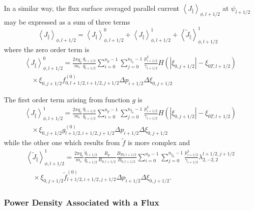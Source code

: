 In a similar way, the flux surface averaged parallel current $\left\langle
J_{\Vert}\right\rangle _{\phi,l+1/2}$ at $\psi_{l+1/2}$ may be expressed as a
sum of three terms
\begin{equation}
\left\langle J_{\Vert}\right\rangle _{\phi,l+1/2}=\left\langle J_{\Vert
}\right\rangle _{\phi,l+1/2}^{0}+\left\langle J_{\Vert}\right\rangle
_{\phi,l+1/2}^{1}+\left\langle \widetilde{J}_{\Vert}\right\rangle
_{\phi,l+1/2}^{1}%
\end{equation}
where the zero order term is
\begin{align}
&\left\langle J_{\Vert}\right\rangle _{\phi,l+1/2}^{0}=\frac{2\pi q_{e}}{m_{e}%
}\frac{q_{l+1/2}}{\overline{q}_{l+1/2}}\sum_{i=0}^{n_{p}-1}\sum_{j=0}%
^{n_{\xi_{0}}-1}\frac{p_{i+1/2}^{3}}{\gamma_{i+1/2}}H\left(  \left|
\xi_{0,j+1/2}\right|  -\xi_{0T,l+1/2}\right)\nonumber\\&\quad\times  \xi_{0,j+1/2}%
f_{0,l+1/2,i+1/2,j+1/2}^{(0)}\Delta p_{i+1/2}\Delta\xi_{0,j+1/2}%
\end{align}

The first order term arising from function $g$ is
\begin{align}
&\left\langle J_{\Vert}\right\rangle _{\phi,l+1/2}^{1}=\frac{2\pi q_{e}}{m_{e}%
}\frac{q_{l+1/2}}{\overline{q}_{l+1/2}}\sum_{i=0}^{n_{p}-1}\sum_{j=0}%
^{n_{\xi_{0}}-1}\frac{p_{i+1/2}^{3}}{\gamma_{i+1/2}}H\left(  \left|
\xi_{0,j+1/2}\right|  -\xi_{0T,l+1/2}\right) \nonumber\\&\quad\times \xi_{0,j+1/2}%
g_{l+1/2,i+1/2,j+1/2}^{(0)}\Delta p_{i+1/2}\Delta\xi_{0,j+1/2}%
\end{align}
while the other one which results from $\widetilde{f}$ is more
complex and
\begin{align}
&\left\langle \widetilde{J}_{\Vert}\right\rangle
_{\phi,l+1/2}^{1}=\frac{2\pi
q_{e}}{m_{e}}\frac{\widetilde{q}_{l+1/2}}{\overline{q}_{l+1/2}}\frac{R_{p}%
}{R_{0,l+1/2}}\frac{B_{T0,l+1/2}}{B_{0,l+1/2}}\sum_{i=0}^{n_{p}-1}\sum
_{j=0}^{n_{\xi_{0}}-1}\frac{p_{i+1/2}^{3}}{\gamma_{i+1/2}}\lambda
_{2,-2,2}^{l+1/2,j+1/2}\nonumber\\&\quad\times\xi_{0,j+1/2}\widetilde{f}_{l+1/2,i+1/2,j+1/2}%
^{(0)}\Delta p_{i+1/2}\Delta\xi_{0,j+1/2}.
\end{align}

\subsubsection{Power Density Associated with a Flux}

